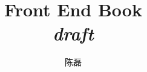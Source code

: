 \documentclass{book}
\begin{document}
\frontmatter
\title{Front End Book \\ \textit{draft}}
\author{陈磊}
\maketitle

\tableofcontents


\mainmatter


% 
% 
% 
% 


% 


% 
% 
% 

% 
% 

\end{document}
